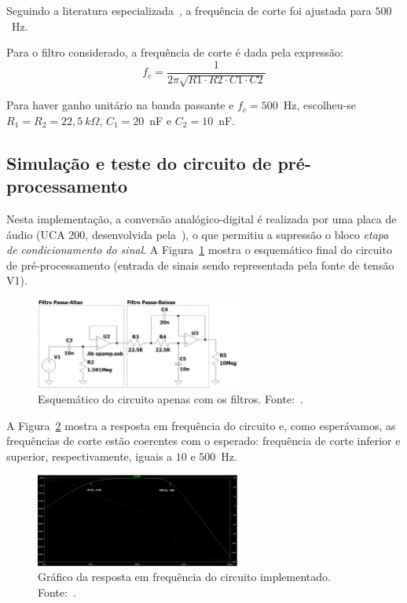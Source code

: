 \documentclass[a4paper,11pt]{article}
\begin{document}
Seguindo a literatura especializada~\parencite{DELUCA2002}, a frequência de corte foi ajustada para $500$~Hz.
 
Para o filtro considerado, a frequência de corte é dada pela expressão:
	\begin{equation}
     	f_c = \frac{1}{2\pi\sqrt{R1 \cdot R2 \cdot C1 \cdot C2}}
     	\label{eq:fcseg}
     \end{equation}

Para haver ganho unitário na banda passante e $f_c = 500$~Hz, escolheu-se  $R_1 = R_2 = 22,5~k\Omega$, $C_1 = 20$~nF e $C_2 = 10$~nF.  


\subsection{Simulação e teste do circuito de pré-processamento}
\label{ssec:simula}	
Nesta implementação, a conversão analógico-digital é realizada por uma placa de áudio (UCA 200, desenvolvida pela~\citeauthor{BEHRINGER2019}), o que permitiu a supressão o bloco \emph{etapa de condicionamento do sinal}. A Figura~\ref{fig:esqsofiltros} mostra o esquemático final do circuito de pré-processamento (entrada de sinais sendo representada pela fonte de tensão V1).
\begin{figure}[h] 
  \centering
  \includegraphics[width=0.6\textwidth]{fig/esquematico_so_filtros}
	\caption{Esquemático do circuito apenas com os filtros. Fonte:~\parencite{limajr2019}.}
  \label{fig:esqsofiltros}
\end{figure} 
	
A Figura~\ref{fig:grafsofiltros} mostra a resposta em frequência do circuito e, como esperávamos, as frequências de corte estão coerentes com o esperado: frequência de corte inferior e superior, respectivamente, iguais a $10$ e $500$~Hz.
\begin{figure}[h] 
  \centering
  \includegraphics[width=0.6\textwidth]{fig/grafico_so_com_filtros}
	\caption{Gráfico da resposta em frequência do circuito implementado. Fonte:~\parencite{limajr2019}.}
  \label{fig:grafsofiltros}
\end{figure} 
	
\end{document}
